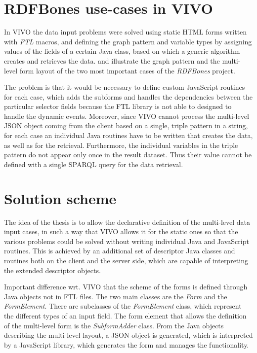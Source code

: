 \section{RDFBones use-cases in VIVO}

In VIVO the data input problems were solved using static HTML forms written with \textit{FTL} macros, and defining the graph pattern and variable types by assigning values of the fields of a certain Java class, based on which a generic algorithm creates and retrieves the data.  and  illustrate the graph pattern and the multi-level form layout of the two most important cases of the \textit{RDFBones} project. 



The problem is that it would be necessary to define custom JavaScript routines for each case, which adds the subforms and handles the dependencies between the particular selector fields because the FTL library is not able to designed to handle the dynamic events. Moreover, since VIVO cannot process the multi-level JSON object coming from the client based on a single, triple pattern in a string, for each case an individual Java routines have to be written that creates the data, as well as for the retrieval. Furthermore, the individual variables in the triple pattern do not appear only once in the result dataset. Thus their value cannot be defined with a single SPARQL query for the data retrieval. 

\section{Solution scheme}

The idea of the thesis is to allow the declarative definition of the multi-level data input cases, in such a way that VIVO allows it for the static ones so that the various problems could be solved without writing individual Java and JavaScript routines. This is achieved by an additional set of descriptor Java classes and routines both on the client and the server side, which are capable of interpreting the extended descriptor objects.

Important difference wrt. VIVO that the scheme of the forms is defined through Java objects not in FTL files. The two main classes are the \textit{Form} and the \textit{FormElement}. There are subclasses of the \textit{FormElement} class, which represent the different types of an input field. The form element that allows the definition of the multi-level form is the \textit{SubformAdder} class. From the Java objects describing the multi-level layout, a JSON object is generated, which is interpreted by a JavaScript library, which generates the form and manages the functionality.

